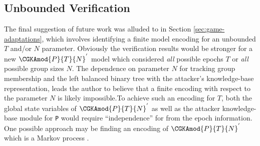 \hypertarget{unbounded-verification}{%
\subsection{Unbounded Verification}\label{unbounded-verification}}

The final suggestion of future work was alluded to in Section \ref{sec:game-adaptations}, which involves identifying a finite model encoding for an unbounded \(T\) and/or \(N\) parameter.
Obviously the verification results would be stronger for a new \( \CGKAmod{P}{T}{N}^{'} \) model which considered \emph{all} possible epochs \(T\) or \emph{all} possible group sizes \(N\).
The dependence on parameter \(N\) for tracking group membership and the left balanced binary tree with the attacker's knowledge-base representation, leads the author to believe that a finite encoding with respect to the parameter \(N\) is likely impossible.To achieve such an encoding for \(T\), both the global state variables of \( \CGKAmod{P}{T}{N}^{'} \) as well as the attacker knowledge-base module for \texttt{P} would require ``independence'' for from the epoch information.
One possible approach may be finding an encoding of \( \CGKAmod{P}{T}{N}^{'} \) which is a Markov process \autocite{markov1906a}.
